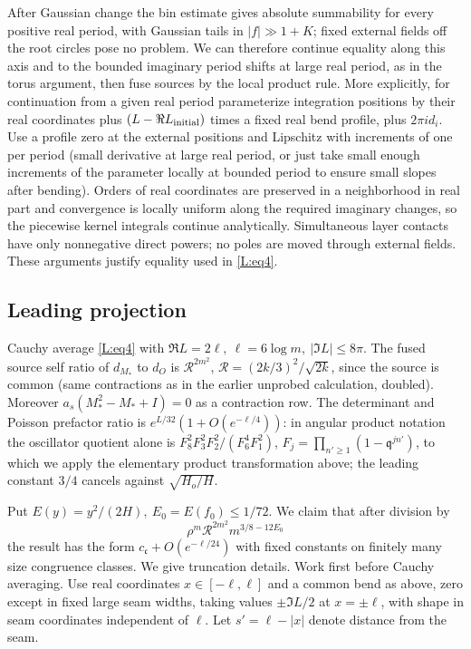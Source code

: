 After Gaussian change the bin estimate gives absolute summability for every positive real period, with Gaussian tails in \(|f|\gg 1+K\); fixed external fields off the root circles pose no problem. We can therefore continue equality along this axis and to the bounded imaginary period shifts at large real period, as in the torus argument, then fuse sources by the local product rule. More explicitly, for continuation from a given real period parameterize integration positions by their real coordinates plus \((L-\Re L_{\rm initial})\) times a fixed real bend profile, plus \(2\pi i d_i\). Use a profile zero at the external positions and Lipschitz with increments of one per period (small derivative at large real period, or just take small enough increments of the parameter locally at bounded period to ensure small slopes after bending). Orders of real coordinates are preserved in a neighborhood in real part and convergence is locally uniform along the required imaginary changes, so the piecewise kernel integrals continue analytically. Simultaneous layer contacts have only nonnegative direct powers; no poles are moved through external fields. These arguments justify equality used in \eqref{L:eq4}.

\subsection{Leading projection}\label{L:step12}

Cauchy average \eqref{L:eq4} with \(\Re L=2\ell,\ \ell=6\log m,\ |\Im L|\le8\pi\). The fused source self ratio of \(d_{M_*}\) to \(d_O\) is \(\mathcal R^{2m^2}\), \(\mathcal R=(2k/3)^2/\sqrt{2k}\), since the source is common (same contractions as in the earlier unprobed calculation, doubled). Moreover \(a_s(M_*^2-M_*+I)=0\) as a contraction row. The determinant and Poisson prefactor ratio is \(e^{L/32}(1+O(e^{-\ell/4}))\): in angular product notation the oscillator quotient alone is \(F_8^2F_3^2F_2^2/(F_6^4F_1^2)\), \(F_j=\prod_{n'\ge1}(1-\mathfrak q^{j n'})\), to which we apply the elementary product transformation above; the leading constant \(3/4\) cancels against \(\sqrt{H_o/H}\).

Put \(E(y)=y^2/(2H),\ E_0=E(f_0)\le1/72\). We claim that after division by
\[
 \rho^m\mathcal R^{2m^2} m^{3/8-12E_0}
\]
the result has the form \(c_{\mathfrak c}+O(e^{-\ell/24})\) with fixed constants on finitely many size congruence classes. We give truncation details. Work first before Cauchy averaging. Use real coordinates \(x\in[-\ell,\ell]\) and a common bend as above, zero except in fixed large seam widths, taking values \(\pm\Im L/2\) at \(x=\pm\ell\), with shape in seam coordinates independent of \(\ell\). Let \(s'=\ell-|x|\) denote distance from the seam.

